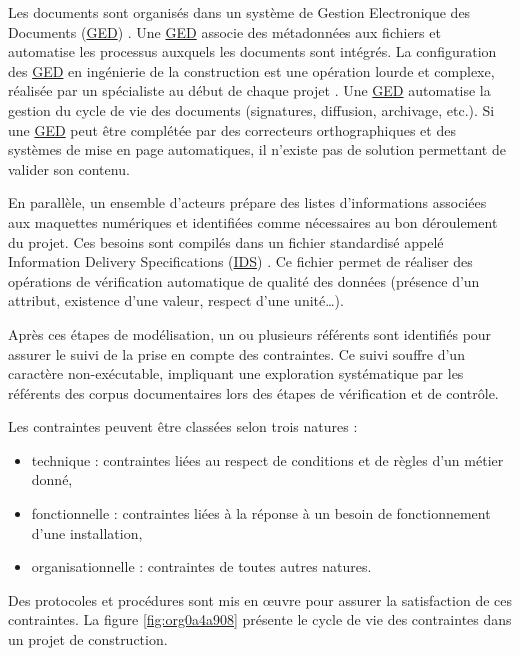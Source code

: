 \documentclass[a4paper,12pt]{article}
\begin{document}
Les documents sont organisés dans un système de Gestion Electronique des Documents
 (\protect\hyperlink{gls-6}{\label{gls-6-use-1}GED}) \autocite{pimoMisePlaceSolutions2021a}. Une \protect\hyperlink{gls-6}{\label{gls-6-use-2}GED} associe des  métadonnées aux fichiers et automatise les processus auxquels les documents sont intégrés. La configuration des \protect\hyperlink{gls-6}{\label{gls-6-use-3}GED} en ingénierie de la construction est une opération lourde et complexe, réalisée par un spécialiste au début de chaque projet \autocite{bjorkElectronicDocumentManagement2006a}. Une \protect\hyperlink{gls-6}{\label{gls-6-use-4}GED}  automatise la gestion du cycle de vie des documents (signatures, diffusion, archivage, etc.). Si une \protect\hyperlink{gls-6}{\label{gls-6-use-5}GED} peut être complétée par des correcteurs orthographiques et des systèmes de mise en page automatiques, il n'existe pas de solution permettant de valider son contenu.

En parallèle, un ensemble d’acteurs prépare des listes d’informations associées aux maquettes numériques et identifiées comme nécessaires au bon déroulement du projet. Ces besoins sont compilés dans un fichier standardisé appelé Information Delivery Specifications
 (\protect\hyperlink{gls-7}{\label{gls-7-use-1}IDS}) \autocite{InformationDeliverySpecification2024a}. Ce fichier permet de réaliser des opérations de vérification automatique de qualité des données (présence d’un attribut, existence d’une valeur, respect d’une unité…).

Après ces étapes de modélisation, un ou plusieurs référents sont identifiés pour assurer le suivi de la prise en compte des contraintes. Ce suivi souffre d'un caractère non-exécutable, impliquant une exploration systématique par les référents  des corpus documentaires lors des étapes de vérification et de contrôle.

Les contraintes peuvent être classées selon trois natures :
\begin{itemize}
\item technique : contraintes liées au respect de conditions et de règles d'un métier donné,
\item fonctionnelle : contraintes liées à la réponse à un besoin de fonctionnement d'une installation,
\item organisationnelle : contraintes de toutes autres natures.
\end{itemize}

Des protocoles et procédures sont mis en œuvre pour assurer la satisfaction de ces contraintes. La figure \ref{fig:org0a4a908} présente le cycle de vie des contraintes dans un projet de construction.
\end{document}
